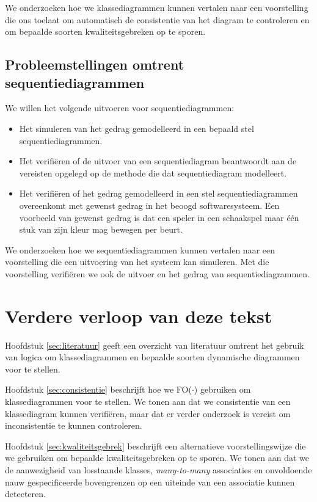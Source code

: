 We onderzoeken hoe we klassediagrammen kunnen vertalen naar een voorstelling die ons toelaat om automatisch de consistentie van het diagram te controleren en om bepaalde soorten kwaliteitsgebreken op te sporen.

\subsection{Probleemstellingen omtrent sequentiediagrammen}

We willen het volgende uitvoeren voor sequentiediagrammen:

\begin{itemize}
	\item Het simuleren van het gedrag gemodelleerd in een bepaald stel sequentiediagrammen.
	\item Het verifi\"eren of de uitvoer van een sequentiediagram beantwoordt aan de vereisten opgelegd op de methode die dat sequentiediagram modelleert.
	\item Het verifi\"eren of het gedrag gemodelleerd in een stel sequentiediagrammen overeenkomt met gewenst gedrag in het beoogd softwaresysteem. Een voorbeeld van gewenst gedrag is dat een speler in een schaakspel maar \'e\'en stuk van zijn kleur mag bewegen per beurt.
\end{itemize}

We onderzoeken hoe we sequentiediagrammen kunnen vertalen naar een voorstelling die een uitvoering van het systeem kan simuleren. Met die voorstelling verifi\"eren we ook de uitvoer en het gedrag van sequentiediagrammen.

\section{Verdere verloop van deze tekst}\label{sec:text-structure}

Hoofdstuk \ref{sec:literatuur} geeft een overzicht van literatuur omtrent het gebruik van logica om klassediagrammen en bepaalde soorten dynamische diagrammen voor te stellen.

Hoofdstuk \ref{sec:consistentie} beschrijft hoe we FO($\cdot$) gebruiken om klassediagrammen voor te stellen. We tonen aan dat we consistentie van een klassediagram kunnen verifi\"eren, maar dat er verder onderzoek is vereist om inconsistentie te kunnen controleren.

Hoofdstuk \ref{sec:kwaliteitsgebrek} beschrijft een alternatieve voorstellingswijze die we gebruiken om bepaalde kwaliteitsgebreken op te sporen. We tonen aan dat we de aanwezigheid van losstaande klasses, \textit{many-to-many} associaties en onvoldoende nauw gespecificeerde bovengrenzen op een uiteinde van een associatie kunnen detecteren.

